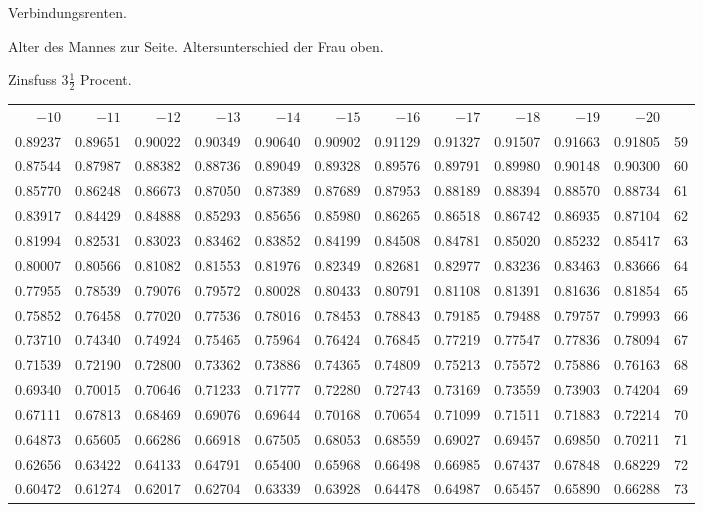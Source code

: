 \clearpage
{}
\begin{center}
Verbindungsrenten.\par\smallskip
Alter des Mannes zur Seite. Altersunterschied der Frau oben.\par\smallskip
Zinsfuss \(3\tfrac{1}{2}\) Procent.\par\medskip
\fontsize{8}{10}\selectfont\setlength{\tabcolsep}{1.3pt}
\begin{tabular}{|rrrrrrrrrrr|r|}
\hline
\(-10\)&\(-11\)&\(-12\)&\(-13\)&\(-14\)&\(-15\)&\(-16\)&\(-17\)&\(-18\)&\(-19\)&\(-20\)&\\[8pt]
0.89237&0.89651&0.90022&0.90349&0.90640&0.90902&0.91129&0.91327&0.91507&0.91663&0.91805&59\\
0.87544&0.87987&0.88382&0.88736&0.89049&0.89328&0.89576&0.89791&0.89980&0.90148&0.90300&60\\
0.85770&0.86248&0.86673&0.87050&0.87389&0.87689&0.87953&0.88189&0.88394&0.88570&0.88734&61\\
0.83917&0.84429&0.84888&0.85293&0.85656&0.85980&0.86265&0.86518&0.86742&0.86935&0.87104&62\\
0.81994&0.82531&0.83023&0.83462&0.83852&0.84199&0.84508&0.84781&0.85020&0.85232&0.85417&63\\
0.80007&0.80566&0.81082&0.81553&0.81976&0.82349&0.82681&0.82977&0.83236&0.83463&0.83666&64\\[5pt]
0.77955&0.78539&0.79076&0.79572&0.80028&0.80433&0.80791&0.81108&0.81391&0.81636&0.81854&65\\
0.75852&0.76458&0.77020&0.77536&0.78016&0.78453&0.78843&0.79185&0.79488&0.79757&0.79993&66\\
0.73710&0.74340&0.74924&0.75465&0.75964&0.76424&0.76845&0.77219&0.77547&0.77836&0.78094&67\\
0.71539&0.72190&0.72800&0.73362&0.73886&0.74365&0.74809&0.75213&0.75572&0.75886&0.76163&68\\
0.69340&0.70015&0.70646&0.71233&0.71777&0.72280&0.72743&0.73169&0.73559&0.73903&0.74204&69\\[5pt]
0.67111&0.67813&0.68469&0.69076&0.69644&0.70168&0.70654&0.71099&0.71511&0.71883&0.72214&70\\
0.64873&0.65605&0.66286&0.66918&0.67505&0.68053&0.68559&0.69027&0.69457&0.69850&0.70211&71\\
0.62656&0.63422&0.64133&0.64791&0.65400&0.65968&0.66498&0.66985&0.67437&0.67848&0.68229&72\\
0.60472&0.61274&0.62017&0.62704&0.63339&0.63928&0.64478&0.64987&0.65457&0.65890&0.66288&73\\

\end{tabular}
\end{center}

